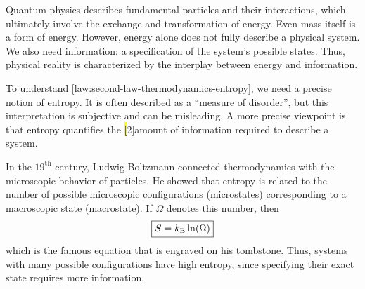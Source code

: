 

Quantum physics describes fundamental particles and their interactions, which ultimately involve the exchange and transformation of energy.
Even mass itself is a form of energy.
However, energy alone does not fully describe a physical system.
We also need information: a specification of the system's possible states.
Thus, physical reality is characterized by the interplay between energy and information.

To understand \autoref{law:second-law-thermodynamics-entropy}, we need a precise notion of entropy.
It is often described as a ``measure of disorder'', but this interpretation is subjective and can be misleading.
A more precise viewpoint is that entropy quantifies the \hl[2]{amount of information required to describe a system}.

In the $19^{\text{th}}$ century, Ludwig Boltzmann connected thermodynamics with the microscopic behavior of particles.
He showed that entropy is related to the number of possible microscopic configurations (microstates) corresponding to a macroscopic state (macrostate).
If \(\Omega\) denotes this number, then
\[
\begin{boxed}
{
S = \kB \ln(\Omega)
}
\end{boxed}
\]
which is the famous equation that is engraved on his tombstone.
Thus, systems with many possible configurations have high entropy, since specifying their exact state requires more information.




